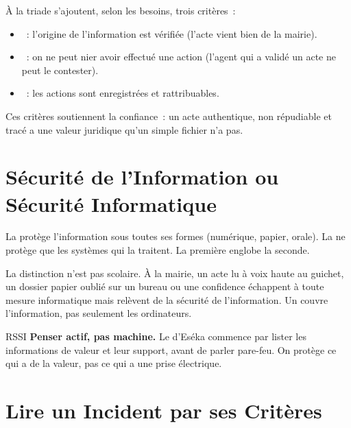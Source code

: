 À la triade s'ajoutent, selon les besoins, trois critères~:

\begin{itemize}
    \item {}~: l'origine de l'information est vérifiée
          (l'acte vient bien de la mairie).
    \item {}~: on ne peut nier avoir effectué une
          action (l'agent qui a validé un acte ne peut le contester).
    \item {}~: les actions sont enregistrées et
          rattribuables.
\end{itemize}

Ces critères soutiennent la confiance~: un acte authentique, non répudiable et
tracé a une valeur juridique qu'un simple fichier n'a pas.

\section{Sécurité de l'Information ou Sécurité Informatique}
\label{sec:c01-perimetre}

\begin{boxdef}
La  protège l'information sous toutes ses
formes (numérique, papier, orale). La  ne
protège que les systèmes qui la traitent. La première englobe la seconde.
\end{boxdef}

La distinction n'est pas scolaire. À la mairie, un acte lu à voix haute au
guichet, un dossier papier oublié sur un bureau ou une confidence échappent à
toute mesure informatique mais relèvent de la sécurité de l'information. Un
 couvre l'information, pas seulement les ordinateurs.

\begin{boxmetier}{RSSI}
\textbf{Penser actif, pas machine.} Le  d'Eséka commence par
lister les informations de valeur et leur support, avant de parler pare-feu.
On protège ce qui a de la valeur, pas ce qui a une prise électrique.
\end{boxmetier}

\section{Lire un Incident par ses Critères}
\label{sec:c01-lecture}

